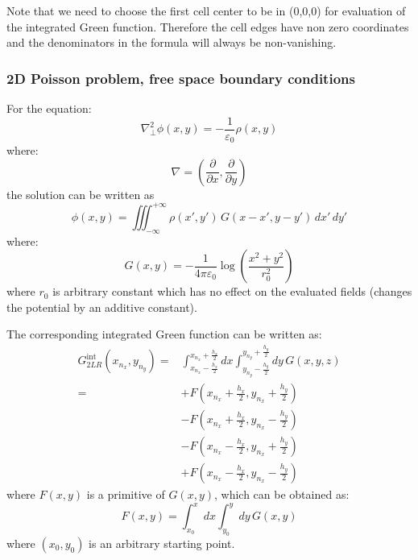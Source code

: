 Note that we need to choose the first cell center to be in (0,0,0) for evaluation of the integrated Green function. Therefore the cell edges have non zero coordinates and the denominators in the formula will always be non-vanishing.

\subsubsection*{2D Poisson problem, free space boundary conditions}

For the equation:
\begin{equation}
\nabla_\perp^2 \phi(x,y) = -\frac{1}{\varepsilon_0} \rho(x,y)
\end{equation}
where:
\begin{equation}
\nabla = \left(\frac{\partial}{\partial x}, 
                      \frac{\partial}{\partial y} \right)
\end{equation}
the solution can be written as 
\begin{equation}
\phi(x, y) = \iiint_{-\infty}^{+\infty} \rho(x', y')
   \,G(x-x', y-y')\,dx'\,dy'
\end{equation}
where:
\begin{equation}
G(x, y) = -\frac{1}{4\pi\varepsilon_0} \log\left( \frac{x^2 + y^2}{r_0^2}\right)
\end{equation}
where $r_0$ is arbitrary constant which has no effect on the evaluated fields (changes the potential by an additive constant). 

The corresponding integrated Green function can be written as:
\begin{align}
G_{2LR}^\text{int}(x_{n_x}, y_{n_y}) =& 
\int_{x_{n_x}-\frac{h_x}{2}}^{x_{n_x}+\frac{h_x}{2}} dx
\int_{y_{n_y}-\frac{h_y}{2}}^{y_{n_y}+\frac{h_y}{2}} dy\,
G(x,y,z)\\
= &+F\left(x_{n_x}+\frac{h_x}{2}, y_{n_x}+\frac{h_y}{2}\right)\\
    &-F\left(x_{n_x}+\frac{h_x}{2}, y_{n_x}-\frac{h_y}{2}\right)\\
    &-F\left(x_{n_x}-\frac{h_x}{2}, y_{n_x}+\frac{h_y}{2}\right)\\ 
    &+F\left(x_{n_x}-\frac{h_x}{2}, y_{n_x}-\frac{h_y}{2}\right)
\end{align}
where $F(x,y)$ is a primitive of $G(x,y)$, which can be obtained as:
\begin{equation}
F(x,y) = 
\int_{x_0}^{x} dx
\int_{y_0}^{y} dy\,
G(x,y)
\end{equation}
where $(x_0, y_0)$ is an arbitrary starting point.

